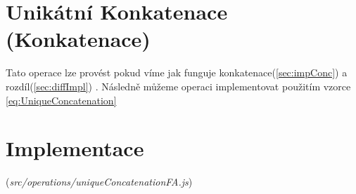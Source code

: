 \section{Unikátní Konkatenace (Konkatenace)}
Tato operace lze provést pokud víme jak funguje konkatenace(\ref{sec:impConc}) a rozdíl(\ref{sec:diffImpl}) . Následně můžeme operaci implementovat použitím vzorce \ref{eq:UniqueConcatenation}
\section{Implementace}
(\textit{src/operations/uniqueConcatenationFA.js})